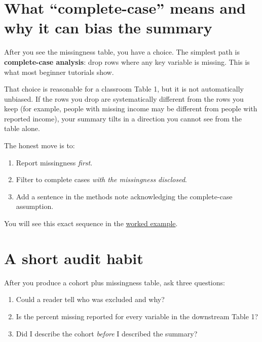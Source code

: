 \documentclass[
  letterpaper,
  DIV=11,
  numbers=noendperiod,
  oneside]{scrreprt}
\providecommand{\tightlist}{%
  \setlength{\itemsep}{0pt}\setlength{\parskip}{0pt}}
\begin{document}
\section*{What ``complete-case'' means and why it can bias the
summary}\label{what-complete-case-means-and-why-it-can-bias-the-summary}


After you see the missingness table, you have a choice. The simplest
path is \textbf{complete-case analysis}: drop rows where any key
variable is missing. This is what most beginner tutorials show.

That choice is reasonable for a classroom Table 1, but it is not
automatically unbiased. If the rows you drop are systematically
different from the rows you keep (for example, people with missing
income may be different from people with reported income), your summary
tilts in a direction you cannot see from the table alone.

The honest move is to:

\begin{enumerate}
\def\labelenumi{\arabic{enumi}.}
\tightlist
\item
  Report missingness \emph{first}.
\item
  Filter to complete cases \emph{with the missingness disclosed}.
\item
  Add a sentence in the methods note acknowledging the complete-case
  assumption.
\end{enumerate}

You will see this exact sequence in the
\href{eda03-worked-example.qmd}{worked example}.

\section*{A short audit habit}\label{a-short-audit-habit}


After you produce a cohort plus missingness table, ask three questions:

\begin{enumerate}
\def\labelenumi{\arabic{enumi}.}
\tightlist
\item
  Could a reader tell who was excluded and why?
\item
  Is the percent missing reported for every variable in the downstream
  Table 1?
\item
  Did I describe the cohort \emph{before} I described the summary?
\end{enumerate}
\end{document}
